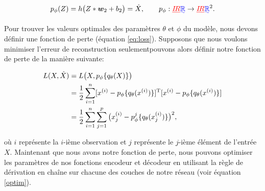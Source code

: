 \begin{gather} \label{eq:decodeurmat}
p_{\phi}(Z)=h\big(Z*\boldsymbol w_2 + b_2\big)=\hat{X}, \qquad
p_{\phi}: \DIFdelbegin %
\DIFdel{I\!R }\DIFdelend \DIFaddbegin \DIFadd{\mathbb{R}}\DIFaddend \rightarrow \DIFdelbegin %
\DIFdel{I\!R}\DIFdelend \DIFaddbegin \DIFadd{\mathbb{R}}\DIFaddend ^2.
\end{gather}

Pour trouver les valeurs optimales des paramètres $\theta$ et $\phi$ du modèle, nous devons définir une fonction de perte (équation \ref{eq:loss}). Supposons que nous voulons minimiser l'erreur de reconstruction seulement\DIFdelbegin {}\DIFdelend \DIFaddbegin {}\DIFaddend pouvons alors définir notre fonction de perte de la manière suivante:

\begin{equation} \label{perte1}
\DIFdelbegin %
\DIFdelend \DIFaddbegin \begin{split}
L(X,\hat{X}) & = L\big(X, p_\phi\{q_\theta(X)\}\big) \\
& = \frac{1}{2} \sum_{i=1}^{n} [x^{(i)}-p_\phi\{q_\theta(x^{(i)})\}]^{\text{T}}[x^{(i)}-p_\phi\{q_\theta(x^{(i)})\}] \\
& = \frac{1}{2} \sum_{i=1}^{n} \sum_{j=1}^{p} \big(x_{j}^{(i)}-p^j_\phi\{q_\theta(x_{j}^{(i)})\}\big)^2,
\end{split}
\DIFaddend \end{equation}

où $i$ représente la $i$-ième observation et $j$ représente le $j$-ième élément de l'entrée $X$. Maintenant que nous avons notre fonction de perte, nous pouvons optimiser les paramètres de nos fonctions encodeur et décodeur en utilisant la règle de dérivation en chaîne sur chacune des couches de notre réseau (voir équation \ref{optim}).

